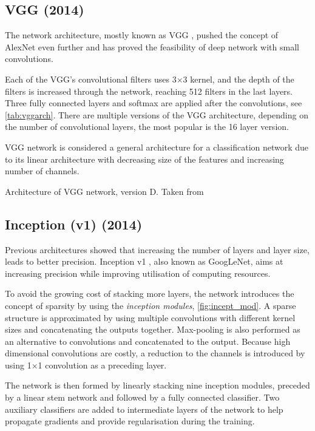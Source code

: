 \subsection{VGG (2014)}
\label{sec:VGG}
The network architecture, mostly known as VGG \cite{bib:vgg}, pushed the concept of AlexNet even further and has proved the feasibility of deep network with small convolutions. 

Each of the VGG's convolutional filters uses 3$\times$3 kernel, and the depth of the filters is increased through the network, reaching 512 filters in the last layers. Three fully connected layers and softmax are applied after the convolutions, see \cref{tab:vggarch}. There are multiple versions of the VGG architecture, depending on the number of convolutional layers, the most popular is the 16 layer version. 

VGG network is considered a general architecture for a classification network due to its linear architecture with decreasing size of the features and increasing number of channels. 

\begin{table}
    \centering
    \caption{Architecture of VGG network, version D. Taken from \cite[table 1]{bib:vgg}}
    \label{tab:vggarch}
\end{table}
    
\subsection{Inception (v1) (2014)}
\label{sec:inception}
Previous architectures showed that increasing the number of layers and layer size, leads to better precision. Inception v1 \cite{bib:googlenet}, also known as GoogLeNet, aims at increasing precision while improving utilisation of computing resources.

To avoid the growing cost of stacking more layers, the network introduces the concept of sparsity by using the \textit{inception modules}, \cref{fig:incept_mod}. A sparse structure is approximated by using multiple convolutions with different kernel sizes and concatenating the outputs together. Max-pooling is also performed as an alternative to convolutions and concatenated to the output. Because high dimensional convolutions are costly, a reduction to the channels is introduced by using 1$\times$1 convolution as a preceding layer.

The network is then formed by linearly stacking nine inception modules, preceded by a linear stem network and followed by a fully connected classifier. Two auxiliary classifiers are added to intermediate layers of the network to help propagate gradients and provide regularisation during the training.


